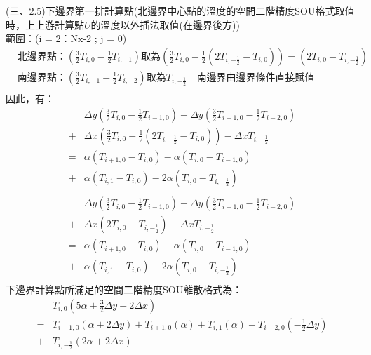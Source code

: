 \documentclass[12pt]{article}
\begin{document}
\noindent (三、2.5)下邊界第一排計算點(北邊界中心點的溫度的空間二階精度SOU格式取值時，上上游計算點$U$的溫度以外插法取值(在邊界後方))\\
\noindent 範圍：(i = 2：Nx-2 ; j = 0)\\
\begin{equation}
  \begin{split}
    &\mbox{北邊界點：}(\frac{3}{2}T_{i,0}-\frac{1}{2}T_{i,-1})\mbox{取為}(\frac{3}{2}T_{i,0}-\frac{1}{2}(2T_{i,-\frac{1}{2}}-T_{i,0})) = (2T_{i,0} - T_{i,-\frac{1}{2}})\\
    &\mbox{南邊界點：}(\frac{3}{2}T_{i,-1}-\frac{1}{2}T_{i,-2})\mbox{取為}T_{i,-\frac{1}{2}}\quad \mbox{南邊界由邊界條件直接賦值}\\ 
  \end{split}
\end{equation}
\noindent 因此，有：
\begin{equation}
\begin{split}
  &\Delta y(\frac{3}{2}T_{i,0} - \frac{1}{2}T_{i-1,0}) - \Delta y(\frac{3}{2}T_{i-1,0} - \frac{1}{2}T_{i-2,0})\\
  + &\Delta x (\frac{3}{2}T_{i,0}-\frac{1}{2}(2T_{i,-\frac{1}{2}}-T_{i,0})) - \Delta x T_{i,-\frac{1}{2}} \\
  = &\alpha (T_{i+1,0} -T_{i,0} ) - \alpha(T_{i,0} -T_{i-1,0}) \\
  + & \alpha (T_{i,1} -T_{i,0}) - 2\alpha(T_{i,0} -T_{i,-\frac{1}{2}}) \\
\end{split}
\end{equation}
\begin{equation}
\begin{split}
  &\Delta y(\frac{3}{2}T_{i,0} - \frac{1}{2}T_{i-1,0}) - \Delta y(\frac{3}{2}T_{i-1,0} - \frac{1}{2}T_{i-2,0})\\
  + &\Delta x (2T_{i,0} - T_{i,-\frac{1}{2}}) - \Delta x T_{i,-\frac{1}{2}} \\
  = &\alpha (T_{i+1,0} -T_{i,0} ) - \alpha(T_{i,0} -T_{i-1,0}) \\
  + & \alpha (T_{i,1} -T_{i,0}) - 2\alpha(T_{i,0} -T_{i,-\frac{1}{2}}) \\
\end{split}
\end{equation}
\noindent 下邊界計算點所滿足的空間二階精度SOU離散格式為：
\begin{equation}
  \begin{split}
    &T_{i,0}(5\alpha+\frac{3}{2}\Delta y+2\Delta x)\\
    = &T_{i-1,0}(\alpha+2\Delta y)+T_{i+1,0}(\alpha)+T_{i,1}(\alpha)+T_{i-2,0}(-\frac{1}{2}\Delta y)\\
    + &T_{i,-\frac{1}{2}}(2\alpha+2\Delta x)
  \end{split}
\end{equation}
\end{document}
